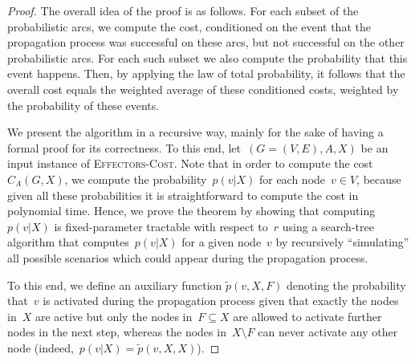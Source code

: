\documentclass{article}
\newcommand{\probCost}{\textsc{Effectors-Cost}\xspace}
\begin{document}
\begin{proof}
  The overall idea of the proof is as follows.
  For each subset of the probabilistic arcs,
  we compute the cost,
  conditioned on the event that the propagation process was successful on these arcs,
  but not successful on the other probabilistic arcs.
  For each such subset we also compute the probability that this event happens.
  Then,
  by applying the law of total probability,
  it follows that the overall cost equals
  the weighted average of these conditioned costs,
  weighted by the probability of these events.
  
  We present the algorithm in a recursive way,
  mainly for the sake of having a formal proof for its correctness.
  To this end,
  let~$(G=(V,E),A,X)$ be an input instance of \probCost.
  Note that in order to compute the cost~$C_A(G,X)$, we
  compute the probability~$p(v|X)$ for each node~$v\in V$,
  because given all these probabilities
  it is straightforward to compute the cost in polynomial time.
  Hence, we prove the theorem by showing that computing~$p(v|X)$
  is fixed-parameter tractable with respect to~$r$
  using a search-tree algorithm that computes~$p(v|X)$
  for a given node~$v$ by recursively ``simulating'' all possible scenarios which
  could appear during the propagation process.
  
  To this end,
  we define an auxiliary function
  $\tilde{p}(v,X,F)$ denoting the probability that~$v$ is
  activated during the propagation process given that exactly the
  nodes in~$X$ are active but only the nodes in~$F\subseteq X$ are
  allowed to activate further nodes in the next step,
  whereas the nodes in~$X\setminus F$ can never activate any other node
  (indeed,~$p(v|X)=\tilde{p}(v,X,X)$).


\end{proof}
\end{document}
